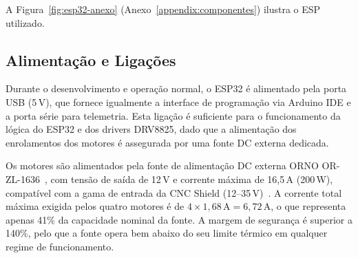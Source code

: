 A Figura~\ref{fig:esp32-anexo} (Anexo~\ref{appendix:componentes}) ilustra o ESP utilizado.



\subsection{Alimentação e Ligações}
\label{subsec:alimentacao-ligacoes}

Durante o desenvolvimento e operação normal, o ESP32 é alimentado pela porta USB (5\,V), que fornece igualmente a interface de programação via Arduino IDE e a porta série para telemetria. Esta ligação é suficiente para o funcionamento da lógica do ESP32 e dos drivers DRV8825, dado que a alimentação dos enrolamentos dos motores é assegurada por uma fonte DC externa dedicada.

Os motores são alimentados pela fonte de alimentação DC externa ORNO OR-ZL-1636~\cite{FonteMauser}, com tensão de saída de 12\,V e corrente máxima de 16,5\,A (200\,W), compatível com a gama de entrada da CNC Shield (12--35\,V)~\cite{JoyITCNCKit2}. A corrente total máxima exigida pelos quatro motores é de $4 \times 1{,}68\,\text{A} = 6{,}72\,\text{A}$, o que representa apenas 41\% da capacidade nominal da fonte. A margem de segurança é superior a 140\%, pelo que a fonte opera bem abaixo do seu limite térmico em qualquer regime de funcionamento.
